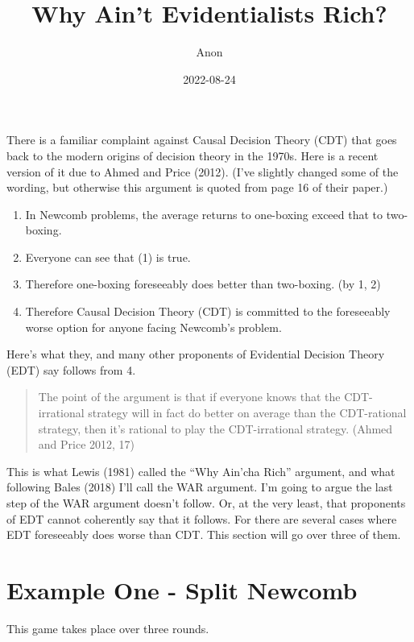 \documentclass[
  12pt,
]{article}
\title{Why Ain't Evidentialists Rich?}
\author{Anon}
\date{2022-08-24}
\providecommand{\tightlist}{%
  \setlength{\itemsep}{0pt}\setlength{\parskip}{0pt}}
\begin{document}
\maketitle

There is a familiar complaint against Causal Decision Theory (CDT) that goes back to the modern origins of decision theory in the 1970s. Here is a recent version of it due to Ahmed and Price (2012). (I've slightly changed some of the wording, but otherwise this argument is quoted from page 16 of their paper.)

\begin{enumerate}
\def\labelenumi{\arabic{enumi}.}
\tightlist
\item
  In Newcomb problems, the average returns to one-boxing exceed that to two-boxing.
\item
  Everyone can see that (1) is true.
\item
  Therefore one-boxing foreseeably does better than two-boxing. (by 1, 2)
\item
  Therefore Causal Decision Theory (CDT) is committed to the foreseeably worse option for anyone facing Newcomb's problem.
\end{enumerate}

Here's what they, and many other proponents of Evidential Decision Theory (EDT) say follows from 4.

\begin{quote}
The point of the argument is that if everyone knows that the CDT-irrational strategy will in fact do better on average than the CDT-rational strategy, then it's rational to play the CDT-irrational strategy. (Ahmed and Price 2012, 17)
\end{quote}

This is what Lewis (1981) called the ``Why Ain'cha Rich'' argument, and what following Bales (2018) I'll call the WAR argument. I'm going to argue the last step of the WAR argument doesn't follow. Or, at the very least, that proponents of EDT cannot coherently say that it follows. For there are several cases where EDT foreseeably does worse than CDT. This section will go over three of them.

\hypertarget{example-one---split-newcomb}{%
\section{Example One - Split Newcomb}\label{example-one---split-newcomb}}

This game takes place over three rounds.
\end{document}
